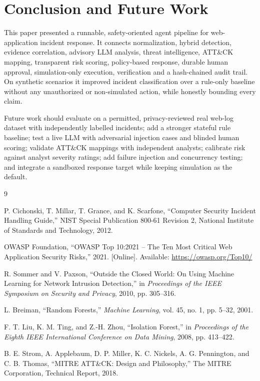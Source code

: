 \documentclass[10pt,twocolumn]{article}
\begin{document}
\section{Conclusion and Future Work}

This paper presented a runnable, safety-oriented agent pipeline for web-application incident response. It connects normalization, hybrid detection, evidence correlation, advisory LLM analysis, threat intelligence, ATT\&CK mapping, transparent risk scoring, policy-based response, durable human approval, simulation-only execution, verification and a hash-chained audit trail. On synthetic scenarios it improved incident classification over a rule-only baseline without any unauthorized or non-simulated action, while honestly bounding every claim.

Future work should evaluate on a permitted, privacy-reviewed real web-log dataset with independently labelled incidents; add a stronger stateful rule baseline; test a live LLM with adversarial injection cases and blinded human scoring; validate ATT\&CK mappings with independent analysts; calibrate risk against analyst severity ratings; add failure injection and concurrency testing; and integrate a sandboxed response target while keeping simulation as the default.

\begin{thebibliography}{9}

P. Cichonski, T. Millar, T. Grance, and K. Scarfone, ``Computer Security Incident Handling Guide,'' NIST Special Publication 800-61 Revision 2, National Institute of Standards and Technology, 2012.

OWASP Foundation, ``OWASP Top 10:2021 -- The Ten Most Critical Web Application Security Risks,'' 2021. [Online]. Available: \url{https://owasp.org/Top10/}

R. Sommer and V. Paxson, ``Outside the Closed World: On Using Machine Learning for Network Intrusion Detection,'' in \emph{Proceedings of the IEEE Symposium on Security and Privacy}, 2010, pp. 305--316.

L. Breiman, ``Random Forests,'' \emph{Machine Learning}, vol. 45, no. 1, pp. 5--32, 2001.

F. T. Liu, K. M. Ting, and Z.-H. Zhou, ``Isolation Forest,'' in \emph{Proceedings of the Eighth IEEE International Conference on Data Mining}, 2008, pp. 413--422.

B. E. Strom, A. Applebaum, D. P. Miller, K. C. Nickels, A. G. Pennington, and C. B. Thomas, ``MITRE ATT\&CK: Design and Philosophy,'' The MITRE Corporation, Technical Report, 2018.

\end{thebibliography}
\end{document}
